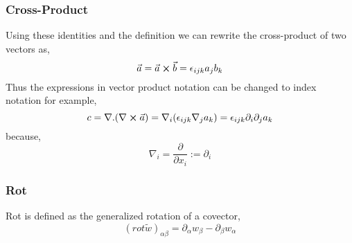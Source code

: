 \subsubsection{Cross-Product}
Using these identities and the definition we can rewrite the cross-product of two vectors as,
\begin{equation}
\vec{a} = \vec{a} \cross \vec{b}  = \epsilon_{ijk}a_{j}b_{k}
\end{equation}
Thus the expressions in vector product notation can be changed to index notation for example,
$$
c = \nabla.(\nabla \cross \vec{a}) = \nabla_{i}(\epsilon_{ijk}\nabla_{j}a_{k}) = \epsilon_{ijk}\partial_{i}\partial_{j}a_{k}
$$
because,
$$\nabla_{i} = \frac{\partial}{\partial x_{i}} := \partial_{i}$$
\subsubsection{Rot}
Rot is defined as the generalized rotation of a covector,
\begin{equation}
{(rot \tilde{w})}_{\alpha \beta} = \partial_{\alpha} w_{\beta} - \partial_{\beta}w_{\alpha}
\end{equation}
